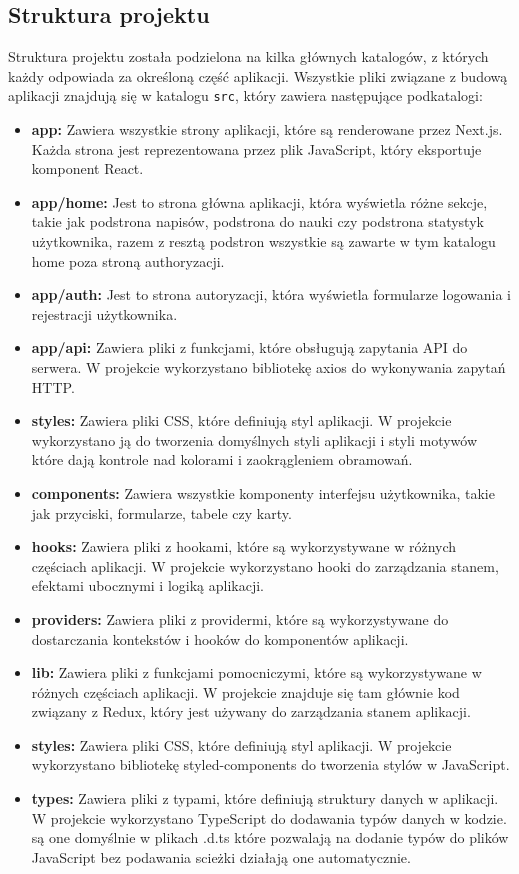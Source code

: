 \subsection{Struktura projektu}
Struktura projektu została podzielona na kilka głównych katalogów, z których każdy odpowiada za określoną część aplikacji. Wszystkie pliki związane z budową aplikacji znajdują się w katalogu \texttt{src}, który zawiera następujące podkatalogi:
\begin{itemize}
    \item \textbf{app:} Zawiera wszystkie strony aplikacji, które są renderowane przez Next.js. Każda strona jest reprezentowana przez plik JavaScript, który eksportuje komponent React.
    \item \textbf{app/home:} Jest to strona główna aplikacji, która wyświetla różne sekcje, takie jak podstrona napisów, podstrona do nauki czy podstrona statystyk użytkownika, razem z resztą podstron wszystkie są zawarte w tym katalogu home poza stroną authoryzacji.
    \item \textbf{app/auth:} Jest to strona autoryzacji, która wyświetla formularze logowania i rejestracji użytkownika.
    \item \textbf{app/api:} Zawiera pliki z funkcjami, które obsługują zapytania API do serwera. W projekcie wykorzystano bibliotekę axios do wykonywania zapytań HTTP.
    \item \textbf{styles:} Zawiera pliki CSS, które definiują styl aplikacji. W projekcie wykorzystano ją do tworzenia domyślnych styli aplikacji i styli motywów które dają kontrole nad kolorami i zaokrągleniem obramowań.
    \item \textbf{components:} Zawiera wszystkie komponenty interfejsu użytkownika, takie jak przyciski, formularze, tabele czy karty.
    \item \textbf{hooks:} Zawiera pliki z hookami, które są wykorzystywane w różnych częściach aplikacji. W projekcie wykorzystano hooki do zarządzania stanem, efektami ubocznymi i logiką aplikacji.
    \item \textbf{providers:} Zawiera pliki z providermi, które są wykorzystywane do dostarczania kontekstów i hooków do komponentów aplikacji.
    \item \textbf{lib:} Zawiera pliki z funkcjami pomocniczymi, które są wykorzystywane w różnych częściach aplikacji. W projekcie znajduje się tam głównie kod związany z Redux, który jest używany do zarządzania stanem aplikacji.
    \item \textbf{styles:} Zawiera pliki CSS, które definiują styl aplikacji. W projekcie wykorzystano bibliotekę styled-components do tworzenia stylów w JavaScript.
    \item \textbf{types:} Zawiera pliki z typami, które definiują struktury danych w aplikacji. W projekcie wykorzystano TypeScript do dodawania typów danych w kodzie. są one domyślnie w plikach .d.ts które pozwalają na dodanie typów do plików JavaScript bez podawania scieżki działają one automatycznie.
\end{itemize}

